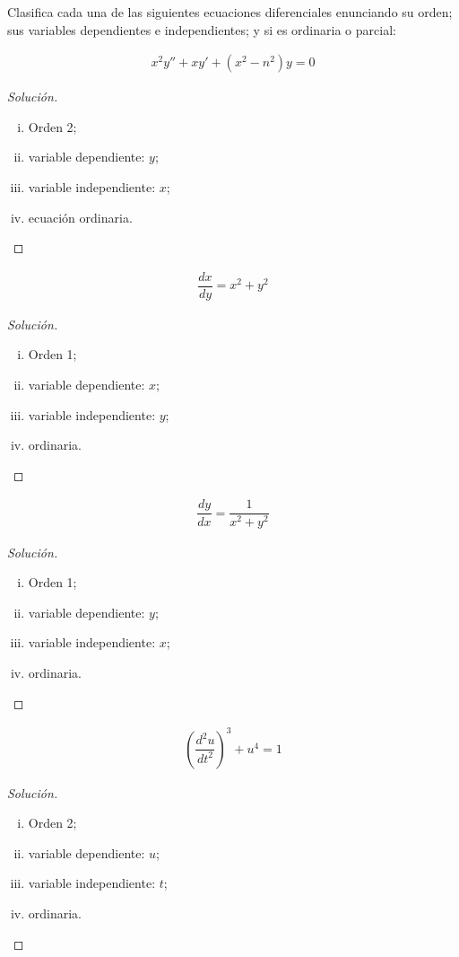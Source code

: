 \begin{resuelto}
	Clasifica cada una de las siguientes ecuaciones diferenciales enunciando su orden; sus variables dependientes e independientes; y si es ordinaria o parcial:

\begin{align}
	x^2y''+xy'+\left(x^2-n^2\right)y = 0
\end{align}

\begin{proof}[Solución]
	\begin{enumerate}[(i)]
		\item Orden 2;
		\item variable dependiente: $ y $;
		\item variable independiente: $ x $;
		\item ecuación ordinaria.
	\end{enumerate}
\end{proof}



\begin{align}
	\dfrac{dx}{dy}= x^{2}+y^{2}
\end{align}
\begin{proof}[Solución]
	\begin{enumerate}[(i)]
		\item Orden 1;
		\item variable dependiente: $ x $;
		\item variable independiente: $ y $;
		\item ordinaria.
	\end{enumerate}
\end{proof}



\begin{align}
	\dfrac{dy}{dx}= \dfrac{1}{x^{2}+y^{2}}
\end{align}
\begin{proof}[Solución]
	\begin{enumerate}[(i)]
		\item Orden 1;
		\item variable dependiente: $ y $;
		\item variable independiente: $ x $;
		\item ordinaria.
	\end{enumerate}
\end{proof}



\begin{align}
	\left(\dfrac{d^{2}u}{dt^{2}}\right)^{3}+u^{4}=1
\end{align}
\begin{proof}[Solución]
	\begin{enumerate}[(i)]
		\item Orden 2;
		\item variable dependiente: $ u $;
		\item variable independiente: $ t $;
		\item ordinaria.
	\end{enumerate}
\end{proof}





\end{resuelto}
